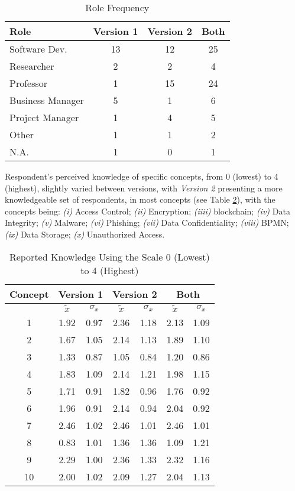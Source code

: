 \begin{table}[htb]
    \centering
    \caption{Role Frequency}
    \label{tab: roles}
    \begin{tabular}{l|cc|c}
    \hline \bf Role & \bf Version 1 & \bf Version 2  & \bf Both \\ \hline
    Software Dev.    & 13 & 12  & 25  \\
    Researcher       & 2 & 2  & 4  \\
    Professor        & 1 & 15 & 24 \\
    Business Manager & 5 & 1  & 6  \\
    Project Manager  & 1 & 4  & 5  \\
    Other            & 1 & 1  & 2  \\
    N.A.             & 1 & 0  & 1  \\
    \hline
    \end{tabular}
\end{table}

Respondent's perceived knowledge of specific concepts, from 0 (lowest) to 4 (highest), slightly varied between versions, with \textit{Version 2} presenting a more knowledgeable set of respondents, in most concepts (see Table \ref{tab: knowledge}), with the concepts being: \emph{(i)} Access Control; \emph{(ii)} Encryption; \emph{(iiii)} blockchain; \emph{(iv)} Data Integrity; \emph{(v)} Malware; \emph{(vi)} Phishing; \emph{(vii)} Data Confidentiality; \emph{(viii)} BPMN; \emph{(ix)} Data Storage; \emph{(x)} Unauthorized Access.

\begin{table}[htb]
    \centering
    \caption{Reported Knowledge Using the Scale 0 (Lowest) to 4 (Highest)}
    \label{tab: knowledge}
    \begin{tabular}{c|cccc|cc}
    \hline 
    \bf Concept & \multicolumn{2}{c}{\bf Version 1} & \multicolumn{2}{c}{\bf Version 2} \vrule & \multicolumn{2}{c}{\bf Both} \\
    \hline
     & $\tilde{x}$ & $\sigma_{x}$ & $\tilde{x}$ & $\sigma_{x}$ & $\tilde{x}$ & $\sigma_{x}$ \\
    \hline
    1 & 1.92 & 0.97 & 2.36 & 1.18 & 2.13 & 1.09 \\
    2 & 1.67 & 1.05 & 2.14 & 1.13 & 1.89 & 1.10 \\
    3 & 1.33 & 0.87 & 1.05 & 0.84 & 1.20 & 0.86 \\
    4 & 1.83 & 1.09 & 2.14 & 1.21 & 1.98 & 1.15 \\
    5 & 1.71 & 0.91 & 1.82 & 0.96 & 1.76 & 0.92 \\
    6 & 1.96 & 0.91 & 2.14 & 0.94 & 2.04 & 0.92 \\
    7 & 2.46 & 1.02 & 2.46 & 1.01 & 2.46 & 1.01 \\
    8 & 0.83 & 1.01 & 1.36 & 1.36 & 1.09 & 1.21 \\
    9 & 2.29 & 1.00 & 2.36 & 1.33 & 2.32 & 1.16 \\
    10 & 2.00 & 1.02 & 2.09 & 1.27 & 2.04 & 1.13 \\
    \hline
    \end{tabular}
\end{table}

